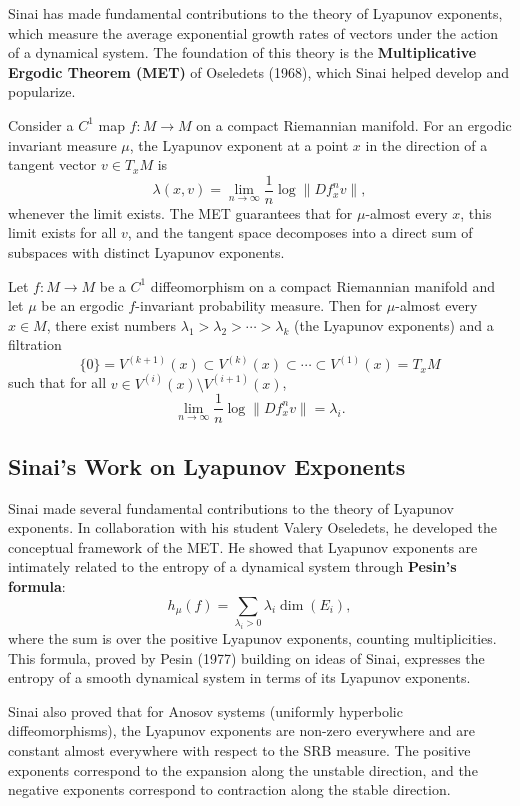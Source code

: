 Sinai has made fundamental contributions to the theory of Lyapunov exponents, which measure the average exponential growth rates of vectors under the action of a dynamical system. The foundation of this theory is the \textbf{Multiplicative Ergodic Theorem (MET)} of Oseledets (1968), which Sinai helped develop and popularize.

Consider a \(C^1\) map \(f: M \to M\) on a compact Riemannian manifold. For an ergodic invariant measure \(\mu\), the Lyapunov exponent at a point \(x\) in the direction of a tangent vector \(v \in T_xM\) is
\[
\lambda(x, v) = \lim_{n \to \infty} \frac{1}{n} \log \| Df_x^n v \|,
\]
whenever the limit exists. The MET guarantees that for \(\mu\)-almost every \(x\), this limit exists for all \(v\), and the tangent space decomposes into a direct sum of subspaces with distinct Lyapunov exponents.

\begin{theorem}
Let \(f: M \to M\) be a \(C^1\) diffeomorphism on a compact Riemannian manifold and let \(\mu\) be an ergodic \(f\)-invariant probability measure. Then for \(\mu\)-almost every \(x \in M\), there exist numbers \(\lambda_1 > \lambda_2 > \cdots > \lambda_k\) (the Lyapunov exponents) and a filtration
\[
\{0\} = V^{(k+1)}(x) \subset V^{(k)}(x) \subset \cdots \subset V^{(1)}(x) = T_xM
\]
such that for all \(v \in V^{(i)}(x) \setminus V^{(i+1)}(x)\),
\[
\lim_{n \to \infty} \frac{1}{n} \log \| Df_x^n v \| = \lambda_i.
\]\end{theorem}

\subsection{Sinai's Work on Lyapunov Exponents}

Sinai made several fundamental contributions to the theory of Lyapunov exponents. In collaboration with his student Valery Oseledets, he developed the conceptual framework of the MET. He showed that Lyapunov exponents are intimately related to the entropy of a dynamical system through \textbf{Pesin's formula}:
\[
h_\mu(f) = \sum_{\lambda_i > 0} \lambda_i \dim(E_i),
\]
where the sum is over the positive Lyapunov exponents, counting multiplicities. This formula, proved by Pesin (1977) building on ideas of Sinai, expresses the entropy of a smooth dynamical system in terms of its Lyapunov exponents.

Sinai also proved that for Anosov systems (uniformly hyperbolic diffeomorphisms), the Lyapunov exponents are non-zero everywhere and are constant almost everywhere with respect to the SRB measure. The positive exponents correspond to the expansion along the unstable direction, and the negative exponents correspond to contraction along the stable direction.

